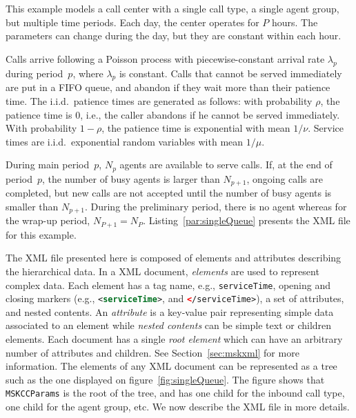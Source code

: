 This example models
a call center with a single call type, a single agent group, but
multiple time periods.
Each day, the center operates for $P$ hours.
The parameters can change during the day, but
they are constant within each hour.

Calls arrive following a Poisson process with piecewise-constant
arrival rate $\lambda_p$ during period~$p$, where
$\lambda_p$ is
constant.
Calls that cannot be served immediately are put in a FIFO queue,
and abandon
if they wait more than their patience time.  The i.i.d.\ patience
times are generated as follows: with probability $\rho$, the patience
time is 0, i.e., the caller abandons if he cannot be served
immediately.  With probability $1-\rho$, the patience time is
exponential with mean $1/\nu$.  Service times are i.i.d.\ exponential random
variables with mean $1/\mu$.

During main period~$p$, $N_p$ agents are available to serve calls.
If, at the end of period~$p$, the number of busy agents is
larger than $N_{p+1}$, ongoing calls are completed, but new
calls are not accepted until the number of busy agents is smaller than
$N_{p+1}$.  During the preliminary period, there is no agent whereas
for the wrap-up period, $N_{P+1}=N_P$.
Listing~\ref{par:singleQueue} presents the XML file for this example.



The XML file presented here is composed of elements and attributes
describing the hierarchical data.
In a XML document, \emph{elements} are used to represent complex
data.  Each element has a tag name, e.g., \texttt{serviceTime},
opening and closing markers (e.g.,
\lstinline[language=XML]{<serviceTime>},
and \lstinline[language=XML]{</serviceTime>}),
a set of attributes, and nested contents.
An \emph{attribute} is a key-value pair representing simple data
associated to an element
while \emph{nested contents} can be simple text or children elements.
Each document has a single \emph{root element} which can have
an arbitrary number of attributes and children.
See Section~\ref{sec:mskxml} for more information.
The elements of any XML document can be represented as a tree
such as the one displayed on figure~\ref{fig:singleQueue}.
The figure shows that \texttt{MSKCCParams} is the root of the tree,
and has one child for the inbound call type, one child for the agent
group, etc.
We now describe the XML file in more details.

